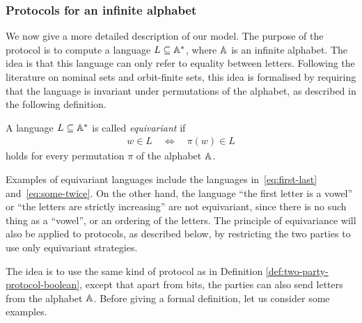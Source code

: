 


\subsubsection{Protocols for an infinite alphabet}
\label{sec:protocols-infinite-alphabet}
We now give a more detailed description of our model. The purpose of the protocol is to compute a language $L \subseteq \mathbb A^*$, where $\mathbb A$ is an infinite alphabet. The idea is that this language can only refer to equality between letters. Following the literature on nominal sets and orbit-finite sets, this idea is formalised by requiring that the language is invariant under permutations of the alphabet, as described in the following definition.

\begin{definition} \label{def:equivariant-language}
    A language $L \subseteq \mathbb A^*$ is called \emph{equivariant} if 
    \begin{align*}
    w \in L \quad \iff \quad \pi(w) \in L
    \end{align*}
    holds for every permutation $\pi$ of the alphabet $\mathbb A$.
\end{definition}

Examples of equivariant languages include the languages in~\eqref{eq:first-last} and~\eqref{eq:some-twice}. On the other hand, the language ``the first letter is a vowel'' or ``the letters are strictly increasing'' are not equivariant, since there is no such thing as a ``vowel'', or an ordering of the letters. The principle of equivariance will also be applied to protocols, as described below, by restricting the two parties to use only equivariant strategies.





The idea is to use the same kind of protocol as in Definition \ref{def:two-party-protocol-boolean}, except that apart from bits, the parties can also send letters  from the alphabet $\mathbb A$. Before giving a formal definition, let us consider some examples. 




